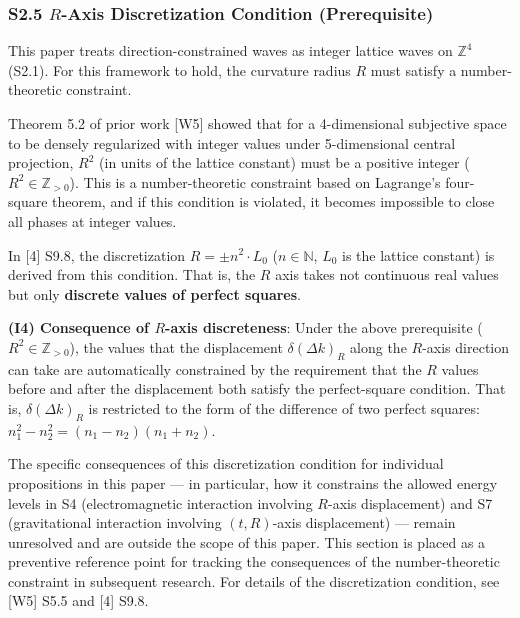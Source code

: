 \documentclass[
  a4paper,11pt]{article}
\theoremstyle{definition}
\theoremstyle{remark}
\begin{document}
\subsubsection{\texorpdfstring{S2.5 \(R\)-Axis Discretization Condition
(Prerequisite)}{S2.5 R-Axis Discretization Condition (Prerequisite)}}\label{s2.5-r-axis-discretization-condition-prerequisite}

This paper treats direction-constrained waves as integer lattice waves
on \(\mathbb{Z}^4\) (S2.1). For this framework to hold, the curvature
radius \(R\) must satisfy a number-theoretic constraint.

Theorem 5.2 of prior work {[}W5{]} showed that for a 4-dimensional
subjective space to be densely regularized with integer values under
5-dimensional central projection, \(R^2\) (in units of the lattice
constant) must be a positive integer (\(R^2 \in \mathbb{Z}_{>0}\)). This
is a number-theoretic constraint based on Lagrange's four-square
theorem, and if this condition is violated, it becomes impossible to
close all phases at integer values.

In {[}4{]} S9.8, the discretization \(R = \pm n^2 \cdot L_0\)
(\(n \in \mathbb{N}\), \(L_0\) is the lattice constant) is derived from
this condition. That is, the \(R\) axis takes not continuous real values
but only \textbf{discrete values of perfect squares}.

\textbf{(I4) Consequence of \(R\)-axis discreteness}: Under the above
prerequisite (\(R^2 \in \mathbb{Z}_{>0}\)), the values that the
displacement \(\delta(\Delta k)_R\) along the \(R\)-axis direction can
take are automatically constrained by the requirement that the \(R\)
values before and after the displacement both satisfy the perfect-square
condition. That is, \(\delta(\Delta k)_R\) is restricted to the form of
the difference of two perfect squares:
\(n_1^2 - n_2^2 = (n_1 - n_2)(n_1 + n_2)\).

The specific consequences of this discretization condition for
individual propositions in this paper --- in particular, how it
constrains the allowed energy levels in S4 (electromagnetic interaction
involving \(R\)-axis displacement) and S7 (gravitational interaction
involving \((t, R)\)-axis displacement) --- remain unresolved and are
outside the scope of this paper. This section is placed as a preventive
reference point for tracking the consequences of the number-theoretic
constraint in subsequent research. For details of the discretization
condition, see {[}W5{]} S5.5 and {[}4{]} S9.8.
\end{document}
